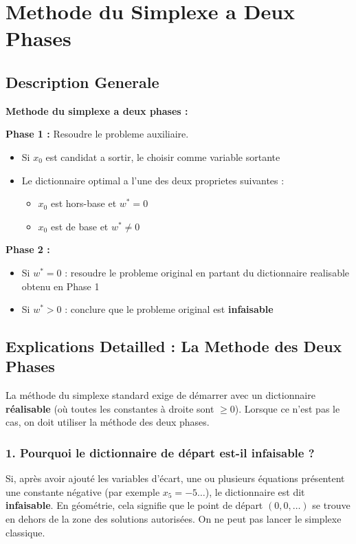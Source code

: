 \documentclass[12pt,a4paper]{article}
\begin{document}
\newpage

\section{Methode du Simplexe a Deux Phases}

\subsection{Description Generale}

\begin{important}
\textbf{Methode du simplexe a deux phases :}

\textbf{\textcolor{titrebleu}{Phase 1 :}} Resoudre le probleme auxiliaire.
\begin{itemize}
    \item Si $x_0$ est candidat a sortir, le choisir comme variable sortante
    \item Le dictionnaire optimal a l'une des deux proprietes suivantes :
    \begin{itemize}
        \item $x_0$ est hors-base et $w^* = 0$
        \item $x_0$ est de base et $w^* \neq 0$
    \end{itemize}
\end{itemize}

\textbf{\textcolor{defvert}{Phase 2 :}}
\begin{itemize}
    \item Si $w^* = 0$ : resoudre le probleme original en partant du dictionnaire realisable obtenu en Phase 1
    \item Si $w^* > 0$ : conclure que le probleme original est \textcolor{importantrouge}{\textbf{infaisable}}
\end{itemize}
\end{important}

\subsection{Explications Detailled : La Methode des Deux Phases}

La méthode du simplexe standard exige de démarrer avec un dictionnaire \textbf{réalisable} (où toutes les constantes à droite sont $\geq 0$). Lorsque ce n'est pas le cas, on doit utiliser la méthode des deux phases.

\subsubsection*{1. Pourquoi le dictionnaire de départ est-il infaisable ?}
Si, après avoir ajouté les variables d'écart, une ou plusieurs équations présentent une constante négative (par exemple $x_5 = -5 \dots$), le dictionnaire est dit \textbf{infaisable}. En géométrie, cela signifie que le point de départ $(0,0,\dots)$ se trouve en dehors de la zone des solutions autorisées. On ne peut pas lancer le simplexe classique.
\end{document}
